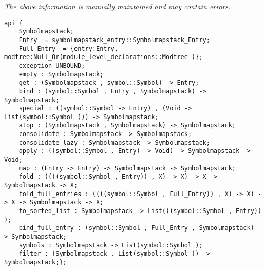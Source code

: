 \label{api:Symbolmapstack}

{\tiny \it The above information is manually maintained and may contain errors.}
\begin{verbatim}
api {
    Symbolmapstack;
    Entry  = symbolmapstack_entry::Symbolmapstack_Entry;
    Full_Entry  = {entry:Entry, modtree:Null_Or(module_level_declarations::Modtree )};
    exception UNBOUND;
    empty : Symbolmapstack;
    get : (Symbolmapstack , symbol::Symbol) -> Entry;
    bind : (symbol::Symbol , Entry , Symbolmapstack) -> Symbolmapstack;
    special : ((symbol::Symbol -> Entry) , (Void -> List(symbol::Symbol ))) -> Symbolmapstack;
    atop : (Symbolmapstack , Symbolmapstack) -> Symbolmapstack;
    consolidate : Symbolmapstack -> Symbolmapstack;
    consolidate_lazy : Symbolmapstack -> Symbolmapstack;
    apply : ((symbol::Symbol , Entry) -> Void) -> Symbolmapstack -> Void;
    map : (Entry -> Entry) -> Symbolmapstack -> Symbolmapstack;
    fold : ((((symbol::Symbol , Entry)) , X) -> X) -> X -> Symbolmapstack -> X;
    fold_full_entries : ((((symbol::Symbol , Full_Entry)) , X) -> X) -> X -> Symbolmapstack -> X;
    to_sorted_list : Symbolmapstack -> List(((symbol::Symbol , Entry)) );
    bind_full_entry : (symbol::Symbol , Full_Entry , Symbolmapstack) -> Symbolmapstack;
    symbols : Symbolmapstack -> List(symbol::Symbol );
    filter : (Symbolmapstack , List(symbol::Symbol )) -> Symbolmapstack;};
\end{verbatim}
